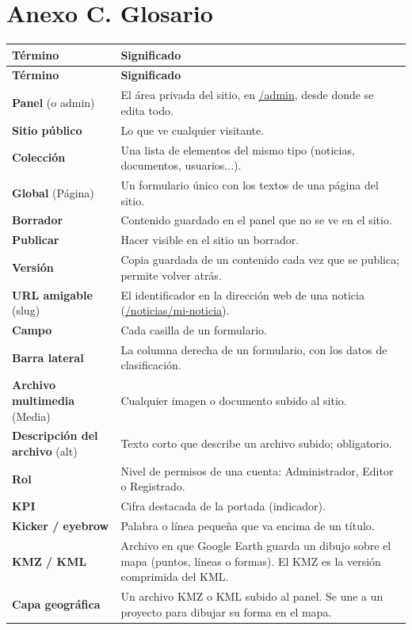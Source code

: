 \documentclass[11pt,letterpaper]{report}
\begin{document}
\section{Anexo C. Glosario}
\begin{longtable}{>{\raggedright\arraybackslash}p{}>{\raggedright\arraybackslash}p{}}
\rowcolor{h2vazul}\textbf{\color{white}Término} & \textbf{\color{white}Significado} \\
\endfirsthead
\rowcolor{h2vazul}\textbf{\color{white}Término} & \textbf{\color{white}Significado} \\
\endhead
\textbf{Panel} (o admin) & El área privada del sitio, en \url{/admin}, desde donde se edita todo. \\ \midrule
\rowcolor{filaalt}\textbf{Sitio público} & Lo que ve cualquier visitante. \\ \midrule
\textbf{Colección} & Una lista de elementos del mismo tipo (noticias, documentos, usuarios...). \\ \midrule
\rowcolor{filaalt}\textbf{Global} (Página) & Un formulario único con los textos de una página del sitio. \\ \midrule
\textbf{Borrador} & Contenido guardado en el panel que no se ve en el sitio. \\ \midrule
\rowcolor{filaalt}\textbf{Publicar} & Hacer visible en el sitio un borrador. \\ \midrule
\textbf{Versión} & Copia guardada de un contenido cada vez que se publica; permite volver atrás. \\ \midrule
\rowcolor{filaalt}\textbf{URL amigable} (slug) & El identificador en la dirección web de una noticia (\url{/noticias/mi-noticia}). \\ \midrule
\textbf{Campo} & Cada casilla de un formulario. \\ \midrule
\rowcolor{filaalt}\textbf{Barra lateral} & La columna derecha de un formulario, con los datos de clasificación. \\ \midrule
\textbf{Archivo multimedia} (Media) & Cualquier imagen o documento subido al sitio. \\ \midrule
\rowcolor{filaalt}\textbf{Descripción del archivo} (alt) & Texto corto que describe un archivo subido; obligatorio. \\ \midrule
\textbf{Rol} & Nivel de permisos de una cuenta: Administrador, Editor o Registrado. \\ \midrule
\rowcolor{filaalt}\textbf{KPI} & Cifra destacada de la portada (indicador). \\ \midrule
\textbf{Kicker / eyebrow} & Palabra o línea pequeña que va encima de un título. \\ \midrule
\rowcolor{filaalt}\textbf{KMZ / KML} & Archivo en que Google Earth guarda un dibujo sobre el mapa (puntos, líneas o formas). El KMZ es la versión comprimida del KML. \\ \midrule
\textbf{Capa geográfica} & Un archivo KMZ o KML subido al panel. Se une a un proyecto para dibujar su forma en el mapa. \\ \bottomrule
\end{longtable}
\end{document}
